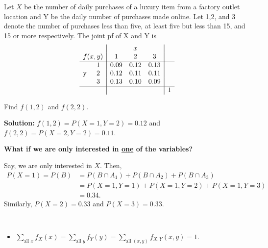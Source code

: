 \begin{example}
    Let $X$ be the number of daily purchases of a luxury item from a factory outlet location and Y be the daily number of purchases made online. Let 1,2, and 3 denote the number of purchases less than five, at least five but less than 15, and 15 or more respectively. The joint pf of X and Y is
    \[
        \begin{array}{cc|ccc|c}
            & & \multicolumn{3}{c|}{x} & \\
            \multicolumn{2}{c|}{f(x,y)} & 1 & 2 & 3 & \\
            \hline
            \multirow{3}{*}{y} 
              & 1 & 0.09 & 0.12 & 0.13 & \\
              & 2 & 0.12 & 0.11 & 0.11 & \\
              & 3 & 0.13 & 0.10 & 0.09 & \\
            \hline
            & & & & & 1
        \end{array}
    \]

    Find $f(1,2)$ and $f(2,2)$.

    \textbf{Solution:} $f(1,2) = P(X=1, Y=2) = 0.12$ and $f(2,2) = P(X=2, Y=2) = 0.11$.
\end{example}

\pagebreak

\textbf{What if we are only interested in \underline{one} of the variables?}

\begin{example}[continued]
    Say, we are only interested in $X$. Then, \vspace{-3mm}
    \begin{align*}
        P(X = 1) = P(B) &= P(B \cap A_1) + P(B \cap A_2) + P(B \cap A_3) \\
        & = P(X=1,Y=1) + P(X=1,Y=2) + P(X=1,Y=3) \\
        & = 0.34.
    \end{align*}
    Similarly, $P(X=2) = 0.33$ and $P(X = 3) = 0.33$.
\end{example}

\begin{note}
    \phantom{}\
    \begin{itemize}
        \item $\displaystyle \sum_{\text{all } x} f_X(x) = \displaystyle \sum_{\text{all } y} f_Y(y) = \displaystyle \sum_{\text{all } (x,y)} f_{X,Y}(x,y) = 1$.
    \end{itemize}
\end{note}


